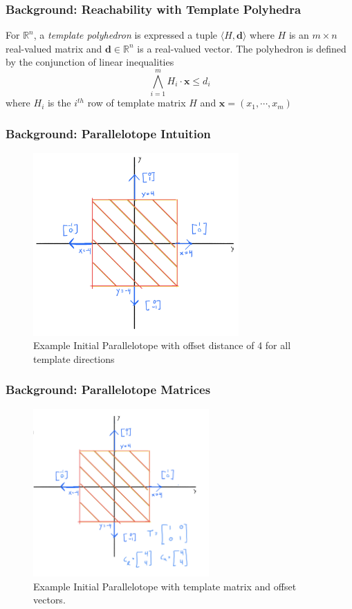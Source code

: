 \documentclass{beamer}
\begin{document}
\begin{frame}
  \frametitle{\textbf{Background:} Reachability with Template Polyhedra}
  \begin{definition}
    For $\mathbb{R}^n$, a \emph{template polyhedron} is expressed a tuple $\langle H, \textbf{d} \rangle$ where $H$ is an $m \times n$ real-valued matrix and $\textbf{d} \in \mathbb{R}^n$ is a real-valued vector. The polyhedron is defined by the conjunction of linear inequalities
    \[ \bigwedge_{i=1}^m H_i\cdot \textbf{x} \leq d_i \]
    where $H_i$ is the $i^{th}$ row of template matrix $H$ and $\textbf{x} = (x_1, \cdots, x_m)$
  \end{definition}
\end{frame}

\begin{frame}
  \frametitle{\textbf{Background:} Parallelotope Intuition}
  \begin{figure}
    \includegraphics[width=0.7\textwidth]{ptopeiniti}
    \caption{Example Initial Parallelotope with offset distance of 4 for all template directions}
  \end{figure}
\end{frame}

\begin{frame}
  \frametitle{\textbf{Background:} Parallelotope Matrices}
  \begin{figure}
    \includegraphics[width=0.6\textwidth]{initptopemat}
    \caption{Example Initial Parallelotope with template matrix and offset vectors.}
  \end{figure}
\end{frame}
\end{document}
